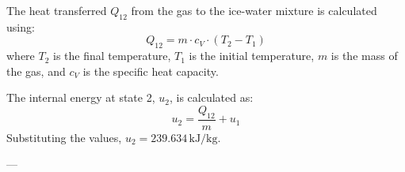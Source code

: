 The heat transferred \( Q_{12} \) from the gas to the ice-water mixture is calculated using:  
\[
Q_{12} = m \cdot c_V \cdot (T_2 - T_1)
\]  
where \( T_2 \) is the final temperature, \( T_1 \) is the initial temperature, \( m \) is the mass of the gas, and \( c_V \) is the specific heat capacity.  

The internal energy at state 2, \( u_2 \), is calculated as:  
\[
u_2 = \frac{Q_{12}}{m} + u_1
\]  
Substituting the values, \( u_2 = 239.634 \, \text{kJ/kg} \).  

---